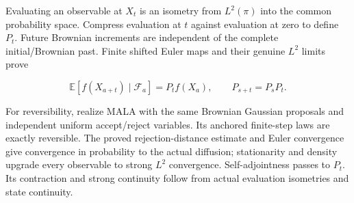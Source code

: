 \documentclass[11pt,a4paper]{report}
\begin{document}
Evaluating an observable at \(X_t\) is an isometry from
    \(L^2(\pi)\) into the common probability space. Compress evaluation at
    \(t\) against evaluation at zero to define \(P_t\).
    Future Brownian increments are independent of the complete
    initial/\allowbreak{}Brownian past. Finite shifted Euler maps and their genuine
    \(L^2\) limits prove


    \[\mathbb E[f(X_{a+t})\mid\mathcal F_a]=P_tf(X_a),
    \qquad P_{s+t}=P_sP_t.\]


For reversibility, realize MALA with the same Brownian Gaussian
    proposals and independent uniform accept/\allowbreak{}reject variables. Its anchored
    finite-step laws are exactly reversible. The proved rejection-distance
    estimate and Euler convergence give convergence in probability to the
    actual diffusion; stationarity and density upgrade every observable to
    strong \(L^2\) convergence. Self-adjointness passes to \(P_t\).
    Its contraction and strong continuity follow from actual evaluation
    isometries and state continuity.
\end{document}
